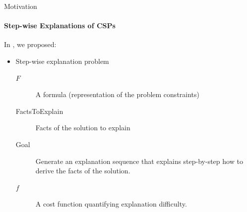 \documentclass[handout]{beamer}
\newcommand\m[1]{\ensuremath{#1}\xspace}
\newcommand\LitsToExplain{FactsToExplain}
\newcommand\theory{\ensuremath{\m{F} }\xspace}
\begin{document}
	
	\begin{frame}{Motivation}
		\framesubtitle{Step-wise Explanations of CSPs}
%		
%
	In \cite{bogaerts2020step}, we proposed:\pause

\begin{itemize}
	\item[$\triangleright$] Step-wise explanation problem \pause
	\begin{description}
		\item[\theory] A formula (representation of the problem constraints) \pause
		\item[\LitsToExplain] Facts of the solution to explain \pause
		\item[Goal] Generate an explanation sequence that explains step-by-step how to derive the facts of the solution.\pause
		\item[$f$] A cost function quantifying explanation difficulty.
	\end{description}


\end{itemize}

	\end{frame}
%	
		
\end{document}
